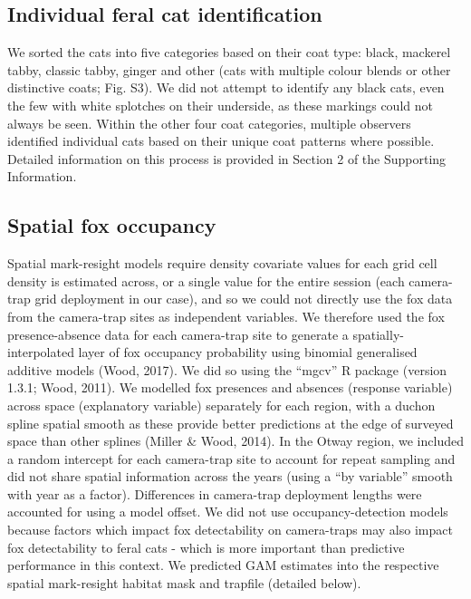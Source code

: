 \documentclass[]{elsarticle} %
\begin{document}
\hypertarget{individual-feral-cat-identification}{%
\subsection{Individual feral cat identification}\label{individual-feral-cat-identification}}

We sorted the cats into five categories based on their coat type: black, mackerel tabby, classic tabby, ginger and other (cats with multiple colour blends or other distinctive coats; Fig. S3).
We did not attempt to identify any black cats, even the few with white splotches on their underside, as these markings could not always be seen.
Within the other four coat categories, multiple observers identified individual cats based on their unique coat patterns where possible.
Detailed information on this process is provided in Section 2 of the Supporting Information.

\hypertarget{spatial-fox-occupancy}{%
\subsection{Spatial fox occupancy}\label{spatial-fox-occupancy}}

Spatial mark-resight models require density covariate values for each grid cell density is estimated across, or a single value for the entire session (each camera-trap grid deployment in our case), and so we could not directly use the fox data from the camera-trap sites as independent variables. We therefore used the fox presence-absence data for each camera-trap site to generate a spatially-interpolated layer of fox occupancy probability using binomial generalised additive models (Wood, 2017). We did so using the ``mgcv'' R package (version 1.3.1; Wood, 2011). We modelled fox presences and absences (response variable) across space (explanatory variable) separately for each region, with a duchon spline spatial smooth as these provide better predictions at the edge of surveyed space than other splines (Miller \& Wood, 2014). In the Otway region, we included a random intercept for each camera-trap site to account for repeat sampling and did not share spatial information across the years (using a ``by variable'' smooth with year as a factor). Differences in camera-trap deployment lengths were accounted for using a model offset. We did not use occupancy-detection models because factors which impact fox detectability on camera-traps may also impact fox detectability to feral cats - which is more important than predictive performance in this context. We predicted GAM estimates into the respective spatial mark-resight habitat mask and trapfile (detailed below).
\end{document}
